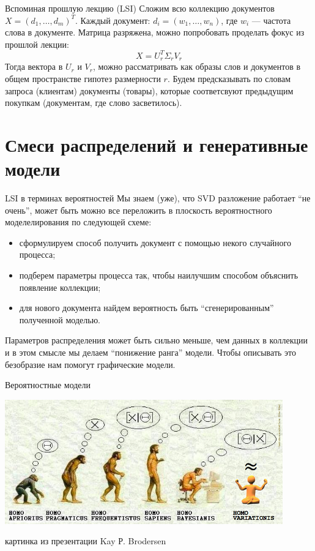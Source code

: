 \documentclass[14pt, fleqn, xcolor={dvipsnames, table}]{beamer}
\begin{document}
\begin{frame}{Вспоминая прошлую лекцию (LSI)}
\small
Сложим всю коллекцию документов $X = (d_1,\ldots,d_m)^T$. Каждый документ: $d_i = (w_1, \dots, w_n)$, где $w_i$ --- частота слова в документе. Матрица разряжена, можно попробовать проделать фокус из прошлой лекции:
$$
X = U^T_r \Sigma_r V_r
$$
Тогда вектора в $U_r$ и $V_r$, можно рассматривать как образы слов и документов в общем пространстве гипотез размерности $r$. Будем предсказывать по словам запроса (клиентам) документы (товары), которые соответсвуют предыдущим покупкам (документам, где слово засветилось).
\end{frame}

\section{Смеси распределений и генеративные модели}

\begin{frame}{LSI в терминах вероятностей}
\small
Мы знаем (уже), что SVD разложение работает ``не очень'', может быть можно все переложить в плоскость вероятностного моделелирования по следующей схеме:
\begin{itemize}
  \item сформулируем способ получить документ с помощью некого случайного процесса;
  \item подберем параметры процесса так, чтобы наилучшим способом объяснить появление коллекции;
  \item для нового документа найдем вероятность быть ``сгенерированным'' полученной моделью.
\end{itemize}
Параметров распределения может быть сильно меньше, чем данных в коллекции и в этом смысле мы делаем ``понижение ранга'' модели. Чтобы описывать это безобразие нам помогут графические модели.
\end{frame}

\begin{frame}{Вероятностные модели}
\begin{center}
\includegraphics[width=0.9\textwidth]{levels.png}
\end{center}
\footnotesize{картинка из презентации Kay Р. Brodersen}
\end{frame}
\end{document}
